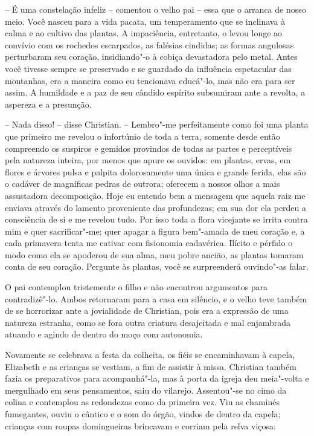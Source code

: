 -- É uma constelação infeliz -- comentou o velho pai -- essa que o
arranca de nosso meio. Você nasceu para a vida pacata, um temperamento
que se inclinava à calma e ao cultivo das plantas. A impaciência,
entretanto, o levou longe ao convívio com os rochedos escarpados, as
falésias cindidas; as formas angulosas perturbaram seu coração,
insidiando"-o à cobiça devastadora pelo metal. Antes você tivesse sempre
se preservado e se guardado da influência espetacular das montanhas,
era a maneira como eu tencionava educá"-lo, mas não era para ser assim.
A humildade e a paz de seu cândido espírito subsumiram ante a revolta,
a aspereza e a presunção.

-- Nada disso! -- disse Christian. -- Lembro"-me perfeitamente como foi uma
planta que primeiro me revelou o infortúnio de toda a terra, somente
desde então compreendo os suspiros e gemidos provindos de todas as
partes e perceptíveis pela natureza inteira, por menos que apure os
ouvidos: em plantas, ervas, em flores e árvores pulsa e palpita
dolorosamente uma única e grande ferida, elas são o cadáver de
magníficas pedras de outrora; oferecem a nossos olhos a mais
assustadora decomposição. Hoje eu entendo bem a mensagem que aquela
raiz me enviava através do lamento proveniente das profundezas; em sua
dor ela perdeu a consciência de si e me revelou tudo. Por isso toda a
flora vicejante se irrita contra mim e quer sacrificar"-me; quer apagar
a figura bem"-amada de meu coração e, a cada primavera tenta me cativar
com fisionomia cadavérica. Ilícito e pérfido o modo como ela se
apoderou de sua alma, meu pobre ancião, as plantas tomaram conta de seu
coração. Pergunte às plantas, você se surpreenderá ouvindo"-as falar.

O pai contemplou tristemente o filho e não encontrou argumentos para
contradizê"-lo. Ambos retornaram para a casa em silêncio, e o velho teve
também de se horrorizar ante a jovialidade de Christian, pois era a
expressão de uma natureza estranha, como se fora outra criatura
desajeitada e mal enjambrada atuando e agindo de dentro do moço com
autonomia.

Novamente se celebrava a festa da colheita, os fiéis se encaminhavam à
capela, Elizabeth e as crianças se vestiam, a fim de assistir à missa.
Christian também fazia os preparativos para acompanhá"-la, mas à porta
da igreja deu meia"-volta e mergulhado em seus pensamentos, saiu do
vilarejo. Assentou"-se no cimo da colina e contemplou as redondezas como
da primeira vez. Viu as chaminés fumegantes, ouviu o cântico e o som do
órgão, vindos de dentro da capela; crianças com roupas domingueiras
brincavam e corriam pela relva viçosa:

